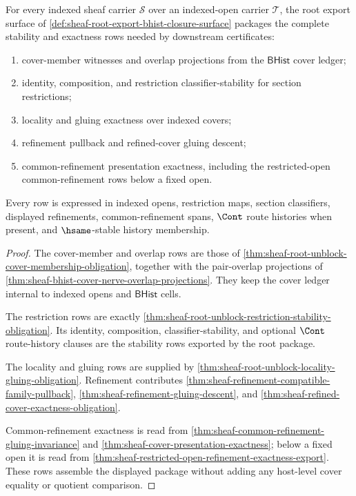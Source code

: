 \begin{theorem}
\label{thm:sheaf-root-export-stability-exactness-package}
For every indexed sheaf carrier $\mathcal{S}$ over an indexed-open carrier $\mathcal{T}$, the root export surface of \autoref{def:sheaf-root-export-bhist-closure-surface} packages the complete stability and exactness rows needed by downstream certificates:
\begin{enumerate}
\item cover-member witnesses and overlap projections from the $\mathsf{BHist}$ cover ledger;
\item identity, composition, and restriction classifier-stability for section restrictions;
\item locality and gluing exactness over indexed covers;
\item refinement pullback and refined-cover gluing descent;
\item common-refinement presentation exactness, including the restricted-open common-refinement rows below a fixed open.
\end{enumerate}
Every row is expressed in indexed opens, restriction maps, section classifiers, displayed refinements, common-refinement spans, $\Cont$ route histories when present, and $\hsame$-stable history membership.
\end{theorem}
\begin{proof}
The cover-member and overlap rows are those of \autoref{thm:sheaf-root-unblock-cover-membership-obligation}, together with the pair-overlap projections of \autoref{thm:sheaf-bhist-cover-nerve-overlap-projections}. They keep the cover ledger internal to indexed opens and $\mathsf{BHist}$ cells.

The restriction rows are exactly \autoref{thm:sheaf-root-unblock-restriction-stability-obligation}. Its identity, composition, classifier-stability, and optional $\Cont$ route-history clauses are the stability rows exported by the root package.

The locality and gluing rows are supplied by \autoref{thm:sheaf-root-unblock-locality-gluing-obligation}. Refinement contributes \autoref{thm:sheaf-refinement-compatible-family-pullback}, \autoref{thm:sheaf-refinement-gluing-descent}, and \autoref{thm:sheaf-refined-cover-exactness-obligation}.

Common-refinement exactness is read from \autoref{thm:sheaf-common-refinement-gluing-invariance} and \autoref{thm:sheaf-cover-presentation-exactness}; below a fixed open it is read from \autoref{thm:sheaf-restricted-open-refinement-exactness-export}. These rows assemble the displayed package without adding any host-level cover equality or quotient comparison.
\end{proof}


